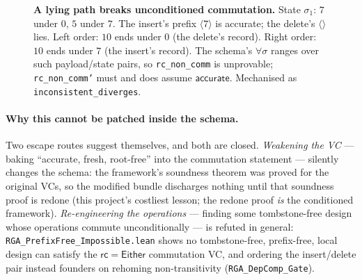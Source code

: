 \documentclass[11pt]{article}
\newcommand{\rc}{\mathsf{rc}}
\newcommand{\Ins}{\mathsf{Ins}}
\newcommand{\Del}{\mathsf{Del}}
\newcommand{\Either}{\mathsf{Either}}
\begin{document}
\begin{figure}[h]
\centering
{}
\caption{\textbf{A lying path breaks unconditioned commutation.} State
$\sigma_1$: $7$ under $0$, $5$ under $7$. The insert's prefix
$\langle 7\rangle$ is accurate; the delete's $\langle\rangle$ lies. Left
order: $10$ ends under $0$ (the delete's record). Right order: $10$ ends
under $7$ (the insert's record). The schema's $\forall\sigma$ ranges over
such payload/state pairs, so \texttt{rc\_non\_comm} is unprovable;
\texttt{rc\_non\_comm'} must and does assume $\mathsf{accurate}$. Mechanised
as \texttt{inconsistent\_diverges}.}
\label{fig:liar}
\end{figure}

\paragraph{Why this cannot be patched inside the schema.} Two escape routes
suggest themselves, and both are closed. \emph{Weakening the VC} --- baking
``accurate, fresh, root-free'' into the commutation statement --- silently
changes the schema: the framework's soundness theorem was proved for the
original VCs, so the modified bundle discharges nothing until that soundness
proof is redone (this project's costliest lesson; the redone proof \emph{is} the
conditioned framework). \emph{Re-engineering the operations} --- finding some
tombstone-free design whose operations commute unconditionally --- is refuted in
general: \texttt{RGA\_PrefixFree\_Impossible.lean} shows no tombstone-free,
prefix-free, local design can satisfy the $\rc=\Either$ commutation VC, and
ordering the insert/delete pair instead founders on rehoming non-transitivity
(\texttt{RGA\_DepComp\_Gate}).
\end{document}
